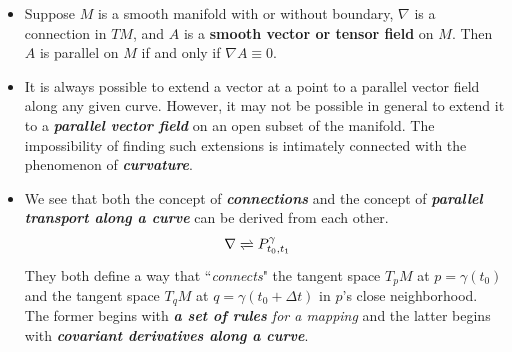 \documentclass[11pt]{article}
\begin{document}
\begin{itemize}
\item \begin{proposition}
Suppose $M$ is a smooth manifold with or without boundary, $\nabla$ is a connection in $TM$, and $A$ is a \textbf{smooth vector or tensor field} on $M$. Then $A$ is
parallel on $M$ if and only if $\nabla A \equiv 0$.
\end{proposition}

\item \begin{remark}
It is always possible to extend a vector at a point to a parallel vector field along any given curve. However, it may not be possible in general to extend it to a \emph{\textbf{parallel vector field}} on an open subset of the manifold. The impossibility of finding such extensions is intimately connected with the phenomenon of \emph{\textbf{curvature}}.
\end{remark}

\item \begin{remark}
We see that both the concept of \emph{\textbf{connections}} and the concept of \emph{\textbf{parallel transport along a curve}} can be derived from each other.
\begin{align*}
\nabla & \xrightleftharpoons{}{} P_{t_0, t_1}^{\gamma}
\end{align*} They both define a way that ``\emph{connects}" the tangent space $T_pM$ at $p=\gamma(t_0)$ and the tangent space $T_{q}M$ at $q = \gamma(t_0 + \Delta t)$ in $p$'s close neighborhood. The former begins with \emph{\textbf{a set of rules} for a mapping} and the latter begins with \emph{\textbf{covariant derivatives along a curve}}.
\end{remark}
\end{itemize}
\end{document}
